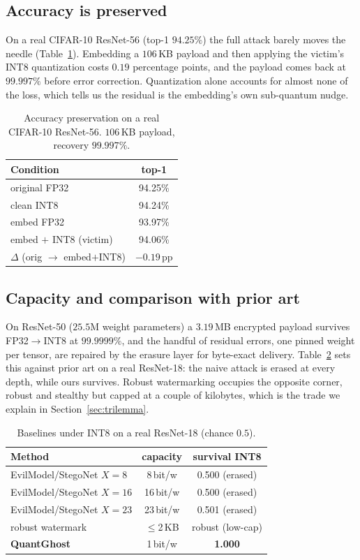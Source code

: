 \documentclass[a4paper,fleqn]{cas-dc}
\theoremstyle{plain}
\theoremstyle{remark}
\newcommand{\sys}{\mbox{QuantGhost}}
\begin{document}
\subsection{Accuracy is preserved}
On a real CIFAR-10 ResNet-56 (top-1 $94.25\%$) the full attack barely moves the needle
(Table~\ref{tab:acc}). Embedding a $106$\,KB payload and then applying the victim's
INT8 quantization costs $0.19$ percentage points, and the payload comes back at
$99.997\%$ before error correction. Quantization alone accounts for almost none of the
loss, which tells us the residual is the embedding's own sub-quantum nudge.

\begin{table}[!tb]\centering
\caption{Accuracy preservation on a real CIFAR-10 ResNet-56. $106$\,KB payload, recovery $99.997\%$.}
\label{tab:acc}
\begin{tabular*}{\columnwidth}{@{\extracolsep{\fill}}lc@{}}
\toprule
Condition & top-1\\
\midrule
original FP32 & 94.25\%\\
clean INT8 & 94.24\%\\
embed FP32 & 93.97\%\\
embed $+$ INT8 (victim) & 94.06\%\\
\midrule
$\Delta$ (orig $\to$ embed$+$INT8) & $-0.19$\,pp\\
\bottomrule
\end{tabular*}
\end{table}

\subsection{Capacity and comparison with prior art}
On ResNet-50 ($25.5$M weight parameters) a $3.19$\,MB encrypted payload survives
FP32$\to$INT8 at $99.9999\%$, and the handful of residual errors, one pinned weight
per tensor, are repaired by the erasure layer for byte-exact delivery.
Table~\ref{tab:baseline} sets this against prior art on a real ResNet-18: the naive
attack is erased at every depth, while ours survives. Robust watermarking
\cite{tondi2022robust,li2021stdm} occupies the opposite corner, robust and stealthy
but capped at a couple of kilobytes, which is the trade we explain in
Section~\ref{sec:trilemma}.

\begin{table}[!tb]\centering
\caption{Baselines under INT8 on a real ResNet-18 (chance $0.5$).}
\label{tab:baseline}
\begin{tabular*}{\columnwidth}{@{\extracolsep{\fill}}lcc@{}}
\toprule
Method & capacity & survival INT8\\
\midrule
EvilModel/StegoNet $X{=}8$ & 8\,bit/w & 0.500 (erased)\\
EvilModel/StegoNet $X{=}16$ & 16\,bit/w & 0.500 (erased)\\
EvilModel/StegoNet $X{=}23$ & 23\,bit/w & 0.501 (erased)\\
robust watermark & $\le$2\,KB & robust (low-cap)\\
\textbf{\sys} & 1\,bit/w & \textbf{1.000}\\
\bottomrule
\end{tabular*}
\end{table}
\end{document}
